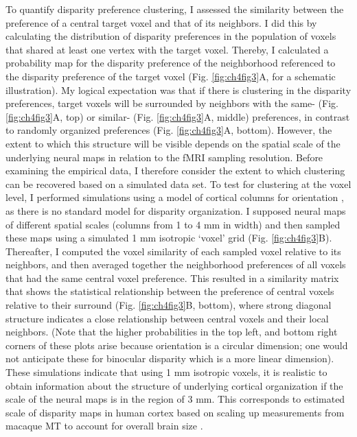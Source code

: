 To quantify disparity preference clustering, I assessed the similarity between the preference of a central target voxel and that of its neighbors. I did this by calculating the distribution of disparity preferences in the population of voxels that shared at least one vertex with the target voxel. Thereby, I calculated a probability map for the disparity preference of the neighborhood referenced to the disparity preference of the target voxel (Fig. \ref{fig:ch4fig3}A, for a schematic illustration). My logical expectation was that if there is clustering in the disparity preferences, target voxels will be surrounded by neighbors with the same- (Fig. \ref{fig:ch4fig3}A, top) or similar- (Fig. \ref{fig:ch4fig3}A, middle) preferences, in contrast to randomly organized preferences (Fig. \ref{fig:ch4fig3}A, bottom). However, the extent to which this structure will be visible depends on the spatial scale of the underlying neural maps in relation to the fMRI sampling resolution. Before examining the empirical data, I therefore consider the extent to which clustering can be recovered based on a simulated data set.
To test for clustering at the voxel level, I performed simulations using a model of cortical columns for orientation \cite{ROJER:1990bq}, as there is no standard model for disparity organization. I supposed neural maps of different spatial scales (columns from 1 to 4 mm in width) and then sampled these maps using a simulated 1 mm isotropic `voxel' grid (Fig. \ref{fig:ch4fig3}B). Thereafter, I computed the voxel similarity of each sampled voxel relative to its neighbors, and then averaged together the neighborhood preferences of all voxels that had the same central voxel preference. This resulted in a similarity matrix that shows the statistical relationship between the preference of central voxels relative to their surround (Fig. \ref{fig:ch4fig3}B, bottom), where strong diagonal structure indicates a close relationship between central voxels and their local neighbors. (Note that the higher probabilities in the top left, and bottom right corners of these plots arise because orientation is a circular dimension; one would not anticipate these for binocular disparity which is a more linear dimension). These simulations indicate that using 1 mm isotropic voxels, it is realistic to obtain information about the structure of underlying cortical organization if the scale of the neural maps is in the region of 3 mm. This corresponds to estimated scale of disparity maps in human cortex based on scaling up measurements from macaque MT to account for overall brain size \cite{DeAngelis:1999fk,Ban:2012jr}.
